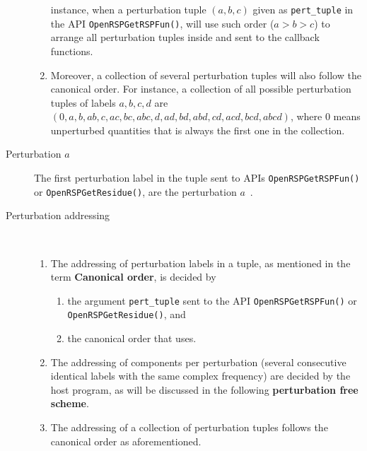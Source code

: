 \begin{description}
\begin{enumerate}
        instance, when a perturbation tuple $(a,b,c)$ given as
        \texttt{pert\_tuple} in the API \texttt{OpenRSPGetRSPFun()},
        \LibName will use such order ($a>b>c$) to arrange all perturbation
        tuples inside and sent to the callback functions.
      \item Moreover, a collection of several perturbation tuples will also
        follow the canonical order. For instance, a collection of all possible
        perturbation tuples of labels $a,b,c,d$ are
        $(0,a,b,ab,c,ac,bc,abc,d,ad,bd,abd,cd,acd,bcd,abcd)$, where $0$ means
        unperturbed quantities that is always the first one in the collection.
    \end{enumerate}
  \item[Perturbation $a$] The first perturbation label in the tuple sent to
    \LibName APIs \texttt{OpenRSPGetRSPFun()} or \texttt{OpenRSPGetResidue()},
    are the perturbation $a$~\cite{Thorvaldsen-JCP-129-214108}.
  \item[Perturbation addressing]~
    \begin{enumerate}
      \item The addressing of perturbation labels in a tuple, as mentioned in
        the term \textbf{Canonical order}, is decided by
        \begin{enumerate}
          \item the argument \texttt{pert\_tuple} sent to the API
            \texttt{OpenRSPGetRSPFun()} or \texttt{OpenRSPGetResidue()}, and
          \item the canonical order that \LibName uses.
        \end{enumerate}
      \item The addressing of components per perturbation (several consecutive
        identical labels with the same complex frequency) are decided by the
        host program, as will be discussed in the following
        \textbf{perturbation free scheme}.
      \item The addressing of a collection of perturbation tuples follows the
        canonical order as aforementioned.
    \end{enumerate}


\end{description}
